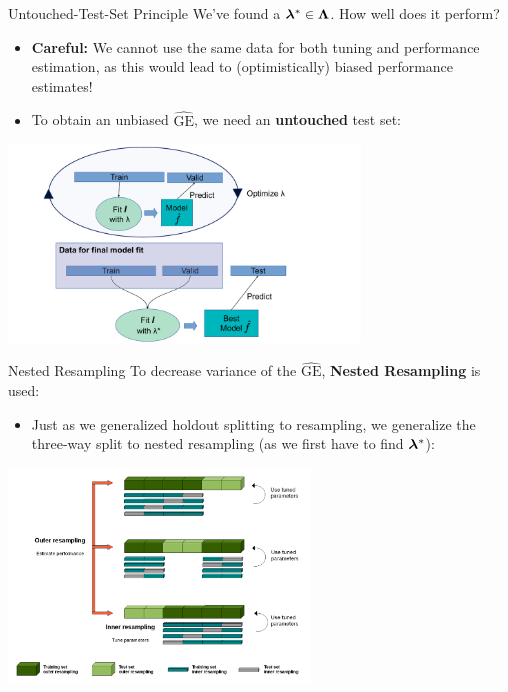 \documentclass[11pt,compress,t,notes=noshow, xcolor=table]{beamer}
\begin{document}
\begin{vbframe}{Untouched-Test-Set Principle}
We've found a $\bm{\lambda}^{*} \in \bm{\Lambda}$. How well does it perform?
\begin{itemize}
\item \textbf{Careful:} We cannot use the same data for both tuning and performance estimation, as this would lead to (optimistically) biased performance estimates!
\item To obtain an unbiased $\widehat{\mathrm{GE}}$, we need an \textbf{untouched} test set:
\end{itemize}
\begin{center}
\includegraphics[width=0.7\textwidth]{../nested-resampling/figure_man/train_valid_test.pdf}
\end{center}

\end{vbframe}



\begin{vbframe}{Nested Resampling}
To decrease variance of the $\widehat{\mathrm{GE}}$, \textbf{Nested Resampling} is used:

\begin{itemize}
\item \small Just as we generalized holdout splitting to resampling, we generalize the three-way split to nested resampling (as we first have to find $\bm{\lambda}^{*}$):
\end{itemize}

\begin{center}
\includegraphics[width = 0.6\textwidth]{../nested-resampling/figure_man/Nested_Resampling.png}
\end{center}

\end{vbframe}
\end{document}
